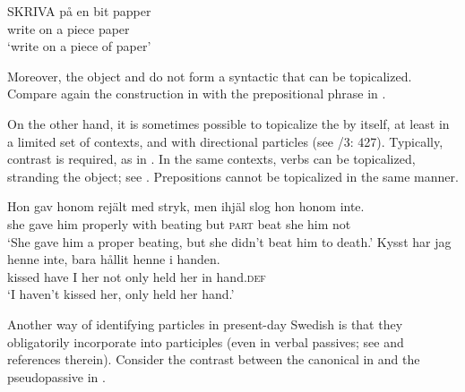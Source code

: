 \documentclass[output=paper]{langscibook}
\begin{document}
\ex\label{ex:lalu:10b}
\gll  SKRIVA  på   en  bit     papper \\
    write     on   a   piece    paper\\
\glt `write on a piece of paper'
\z
\z


Moreover, the object and  do not form a syntactic  that can be topicalized. Compare again the  construction in  with the  prepositional phrase in .


\ea\label{ex:lalu:11}
\z
\z


On the other hand, it is sometimes possible to topicalize the  by itself, at least in a limited set of contexts, and with directional particles (see \citealt{TelemanEtAl1999}/3: 427). Typically, contrast is required, as in . In the same contexts, verbs can be topicalized, stranding the object; see . Prepositions cannot be topicalized in the same manner.


\ea\label{ex:lalu:12}
\gll  Hon   gav     honom   rejält       med   stryk,     men   ihjäl        slog   hon  honom  inte. \\
she     gave     him   properly     with   beating     but     \textsc{part} beat   she   him     not\\
\glt `She gave him a proper beating, but she didn’t beat him to death.'
\ex\label{ex:lalu:13}
\gll  Kysst     har   jag   henne   inte,   bara   hållit  henne   i     handen.\\
kissed   have   I   her     not     only   held   her   in   hand\textsc{.def}\\
\glt `I haven’t kissed her, only held her hand.' \citep{Holmberg1997}\\
\z


Another way of identifying particles in present-day Swedish is that they obligatorily incorporate into participles (even in verbal passives; see \citealt{Lundquist2014Passives} and references therein). Consider the contrast between the canonical  in  and the pseudopassive in .
\end{document}
